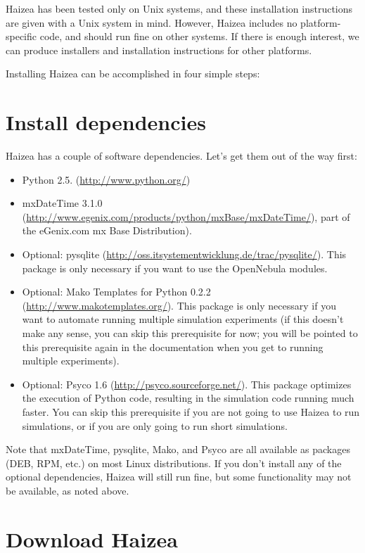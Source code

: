 Haizea has been tested only on Unix systems, and these installation instructions are given with a Unix system in mind. However, Haizea includes no platform-specific code, and should run fine on other systems. If there is enough interest, we can produce installers and installation instructions for other platforms.

Installing Haizea can be accomplished in four simple steps:

\section{Install dependencies}

Haizea has a couple of software dependencies. Let's get them out of the way first:

\begin{itemize}
\item Python 2.5. (\url{http://www.python.org/})
\item mxDateTime 3.1.0 (\url{http://www.egenix.com/products/python/mxBase/mxDateTime/}), part of the eGenix.com mx Base Distribution).
\item Optional: pysqlite (\url{http://oss.itsystementwicklung.de/trac/pysqlite/}). This package is only necessary if you want to use the OpenNebula modules.
\item Optional: Mako Templates for Python 0.2.2 (\url{http://www.makotemplates.org/}). This package is only necessary if you want to automate running multiple simulation experiments (if this doesn't make any sense, you can skip this prerequisite for now; you will be pointed to this prerequisite again in the documentation when you get to running multiple experiments).
\item Optional: Psyco 1.6 (\url{http://psyco.sourceforge.net/}). This package optimizes the execution of Python code, resulting in the simulation code running much faster. You can skip this prerequisite if you are not going to use Haizea to run simulations, or if you are only going to run short simulations.
\end{itemize}

Note that mxDateTime, pysqlite, Mako, and Psyco are all available as packages (DEB, RPM, etc.) on most Linux distributions. If you don't install any of the optional dependencies, Haizea will still run fine, but some functionality may not be available, as noted above.

\section{Download Haizea}

